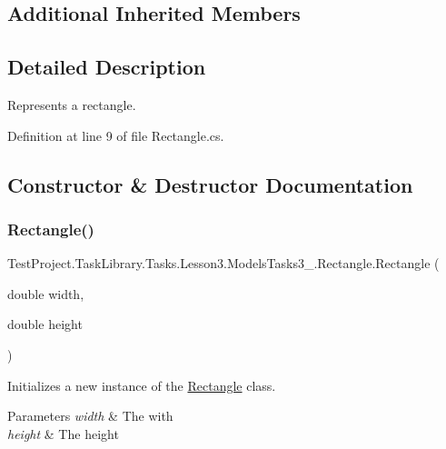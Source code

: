 \subsection*{Additional Inherited Members}


\subsection{Detailed Description}
Represents a rectangle. 



Definition at line 9 of file Rectangle.\+cs.



\subsection{Constructor \& Destructor Documentation}
\mbox{\label{class_test_project_1_1_task_library_1_1_tasks_1_1_lesson3_1_1_models_tasks3__4_1_1_rectangle_ac0b6acccad1e2fce63f4cc0a3e3bbae8}} 
\subsubsection{\texorpdfstring{Rectangle()}{Rectangle()}}
{\footnotesize\ttfamily Test\+Project.\+Task\+Library.\+Tasks.\+Lesson3.\+Models\+Tasks3\+\_.\+Rectangle.\+Rectangle (\begin{DoxyParamCaption}\item[{double}]{width,  }\item[{double}]{height }\end{DoxyParamCaption})}



Initializes a new instance of the \mbox{\hyperlink{class_test_project_1_1_task_library_1_1_tasks_1_1_lesson3_1_1_models_tasks3__4_1_1_rectangle}{Rectangle}} class. 


\begin{DoxyParams}{Parameters}
{\em width} & The with\\
\hline
{\em height} & The height\\
\hline
\end{DoxyParams}


